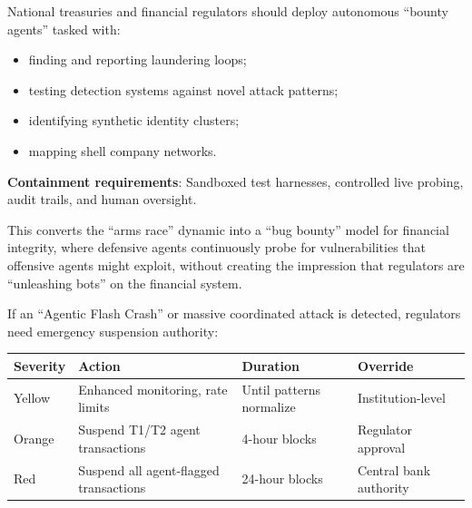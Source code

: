 \documentclass[11pt,letterpaper]{article}
\begin{document}
\begin{recbox}
National treasuries and financial regulators should deploy autonomous ``bounty agents'' tasked with:
\begin{itemize}
  \item finding and reporting laundering loops;
  \item testing detection systems against novel attack patterns;
  \item identifying synthetic identity clusters;
  \item mapping shell company networks.
\end{itemize}

\textbf{Containment requirements}: Sandboxed test harnesses, controlled live probing, audit trails, and human oversight.

This converts the ``arms race'' dynamic into a ``bug bounty'' model for financial integrity, where defensive agents continuously probe for vulnerabilities that offensive agents might exploit, without creating the impression that regulators are ``unleashing bots'' on the financial system.
\end{recbox}

\begin{recbox}
If an ``Agentic Flash Crash'' or massive coordinated attack is detected, regulators need emergency suspension authority:

\begin{center}
\small
\begin{tabular}{L{2cm}L{5cm}L{3cm}L{2.5cm}}
\toprule
\textbf{Severity} & \textbf{Action} & \textbf{Duration} & \textbf{Override} \\
\midrule
Yellow & Enhanced monitoring, rate limits & Until patterns normalize & Institution-level \\
Orange & Suspend T1/T2 agent transactions & 4-hour blocks & Regulator approval \\
Red & Suspend all agent-flagged transactions & 24-hour blocks & Central bank authority \\
\bottomrule
\end{tabular}
\end{center}
\end{recbox}
\end{document}
